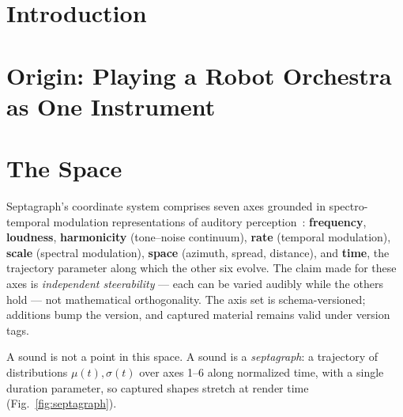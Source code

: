 \documentclass[10pt,twocolumn]{article}
\begin{document}
\section{Introduction}


\section{Origin: Playing a Robot Orchestra as One Instrument}
\label{sec:origin}


\section{The Space}
\label{sec:space}

Septagraph's coordinate system comprises seven axes grounded in
spectro-temporal modulation representations of auditory
perception~\cite{shamma,mcdermott}: \textbf{frequency},
\textbf{loudness}, \textbf{harmonicity} (tone--noise continuum),
\textbf{rate} (temporal modulation), \textbf{scale} (spectral
modulation), \textbf{space} (azimuth, spread, distance), and
\textbf{time}, the trajectory parameter along which the other six
evolve. The claim made for these axes is \emph{independent
steerability} --- each can be varied audibly while the others hold ---
not mathematical orthogonality. The axis set is schema-versioned;
additions bump the version, and captured material remains valid under
version tags.

A sound is not a point in this space. A sound is a
\emph{septagraph}: a trajectory of distributions $\mu(t), \sigma(t)$
over axes 1--6 along normalized time, with a single duration
parameter, so captured shapes stretch at render time
(Fig.~\ref{fig:septagraph}).
\end{document}
